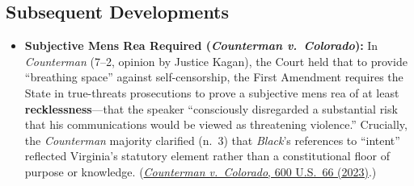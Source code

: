 \documentclass[12pt]{article}
\begin{document}
\subsection{Subsequent Developments}

\begin{itemize}

\item \textbf{Subjective Mens Rea Required (\textit{Counterman v.\ Colorado}):} In \textit{Counterman} (7--2, opinion by Justice Kagan), the Court held that to provide ``breathing space'' against self-censorship, the First Amendment requires the State in true-threats prosecutions to prove a subjective mens rea of at least \textbf{recklessness}---that the speaker ``consciously disregarded a substantial risk that his communications would be viewed as threatening violence.'' Crucially, the \textit{Counterman} majority clarified (n.~3) that \textit{Black}'s references to ``intent'' reflected Virginia's statutory element rather than a constitutional floor of purpose or knowledge. (\href{https://supreme.justia.com/cases/federal/us/600/22-138/}{\textit{Counterman v.\ Colorado}, 600 U.S.\ 66 (2023)}.)

\end{itemize}
\end{document}
